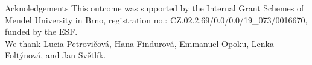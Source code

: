 \documentclass[final]{beamer}
\newlength{\sepwidth}
\newlength{\colwidth}
\newcommand{\separatorcolumn}{\begin{column}{\sepwidth}\end{column}}
\begin{document}
\begin{frame}[t]
\begin{columns}[t]
\begin{column}{\colwidth}
%

\begin{block}{Acknoledgements}
    This outcome was supported by the Internal Grant Schemes of Mendel University in Brno, registration no.: CZ.02.2.69/0.0/0.0/19\_073/0016670, funded by the ESF. \\
    We thank Lucia Petrovičová, Hana Findurová, Emmanuel Opoku, Lenka Foltýnová, and Jan Světlík.
\end{block}

\end{column}
%
%
\end{columns}
\end{frame}
\end{document}
